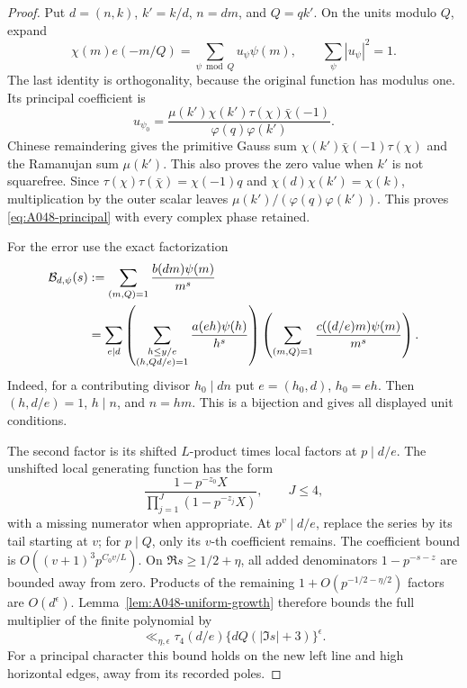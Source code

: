 \begin{proof}
Put \(d=(n,k)\), \(k'=k/d\), \(n=dm\), and \(Q=qk'\).
On the units modulo \(Q\), expand
\begin{equation}\label{eq:A048-parseval}
 \chi(m)e(-m/Q)=\sum_{\psi\bmod Q}u_\psi\psi(m),
       \qquad \sum_\psi|u_\psi|^2=1.
\end{equation}
The last identity is orthogonality, because the original
function has modulus one. Its principal coefficient is
\begin{equation}\label{eq:A048-induced-gauss}
 u_{\psi_0}
 =\frac{\mu(k')\chi(k')\tau(\chi)\bar\chi(-1)}
        {\varphi(q)\varphi(k')}.
\end{equation}
Chinese remaindering gives the primitive Gauss sum
\(\chi(k')\bar\chi(-1)\tau(\chi)\) and the Ramanujan
sum \(\mu(k')\). This also proves the zero value when
\(k'\) is not squarefree. Since
\(\tau(\chi)\tau(\bar\chi)=\chi(-1)q\) and
\(\chi(d)\chi(k')=\chi(k)\), multiplication by the
outer scalar leaves
\(\mu(k')/(\varphi(q)\varphi(k'))\).
This proves \eqref{eq:A048-principal} with every
complex phase retained.

For the error use the exact factorization
\begin{align}
 {\cal B}_{d,\psi}(s)
 &:=
 \sum_{(m,Q)=1}\frac{b(dm)\psi(m)}{m^s}\nonumber\\
 &=\sum_{e\mid d}
   \left(\sum_{\substack{h\le y/e\\(h,Qd/e)=1}}
             \frac{a(eh)\psi(h)}{h^s}\right)
   \left(\sum_{(m,Q)=1}
             \frac{c((d/e)m)\psi(m)}{m^s}\right).
 \label{eq:A048-gcd-factorization}
\end{align}
Indeed, for a contributing divisor \(h_0\mid dn\)
put \(e=(h_0,d)\), \(h_0=eh\). Then
\((h,d/e)=1\), \(h\mid n\), and \(n=hm\).
This is a bijection and gives all displayed unit
conditions.

The second factor is its shifted \(L\)-product
times local factors at \(p\mid d/e\).
The unshifted local generating function has the form
\[
 \frac{1-p^{-z_0}X}
      {\prod_{j=1}^{J}(1-p^{-z_j}X)},\qquad J\le4,
\]
with a missing numerator when appropriate.
At \(p^v\mid d/e\), replace the series by its tail
starting at \(v\); for \(p\mid Q\), only its \(v\)-th
coefficient remains. The coefficient bound is
\(O((v+1)^3p^{C_0v/L})\).
On \(\Re s\ge1/2+\eta\), all added denominators
\(1-p^{-s-z}\) are bounded away from zero.
Products of the remaining
\(1+O(p^{-1/2-\eta/2})\) factors are \(O(d^\epsilon)\).
Lemma~\ref{lem:A048-uniform-growth} therefore bounds
the full multiplier of the finite polynomial by
\[
 \ll_{\eta,\epsilon}\tau_4(d/e)
                 \{dQ(|\Im s|+3)\}^{\epsilon}.
\]
For a principal character this bound holds on the
new left line and high horizontal edges, away from
its recorded poles.


\end{proof}
